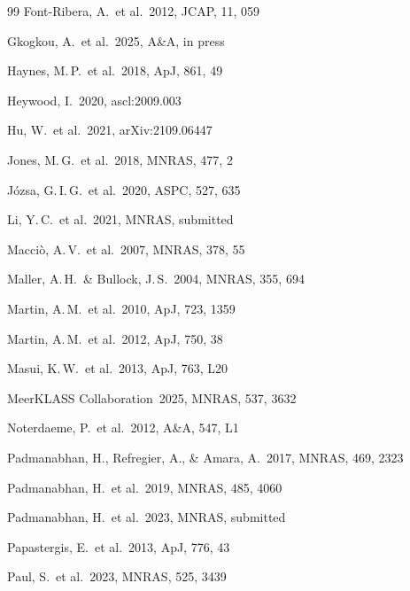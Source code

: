 \documentclass[10pt,a4paper]{article}
\begin{document}
\begin{thebibliography}{99}
Font-Ribera, A.\ et al.\ 2012, JCAP, 11, 059

Gkogkou, A.\ et al.\ 2025, A\&A, in press

Haynes, M.\,P.\ et al.\ 2018, ApJ, 861, 49

Heywood, I.\ 2020, ascl:2009.003

Hu, W.\ et al.\ 2021, arXiv:2109.06447

Jones, M.\,G.\ et al.\ 2018, MNRAS, 477, 2

J{\'o}zsa, G.\,I.\,G.\ et al.\ 2020, ASPC, 527, 635

Li, Y.\,C.\ et al.\ 2021, MNRAS, submitted

Macci{\`o}, A.\,V.\ et al.\ 2007, MNRAS, 378, 55

Maller, A.\,H.\ \& Bullock, J.\,S.\ 2004, MNRAS, 355, 694

Martin, A.\,M.\ et al.\ 2010, ApJ, 723, 1359

Martin, A.\,M.\ et al.\ 2012, ApJ, 750, 38

Masui, K.\,W.\ et al.\ 2013, ApJ, 763, L20

MeerKLASS Collaboration\ 2025, MNRAS, 537, 3632

Noterdaeme, P.\ et al.\ 2012, A\&A, 547, L1

Padmanabhan, H., Refregier, A., \& Amara, A.\ 2017, MNRAS, 469, 2323

Padmanabhan, H.\ et al.\ 2019, MNRAS, 485, 4060

Padmanabhan, H.\ et al.\ 2023, MNRAS, submitted

Papastergis, E.\ et al.\ 2013, ApJ, 776, 43

Paul, S.\ et al.\ 2023, MNRAS, 525, 3439


\end{thebibliography}
\end{document}
